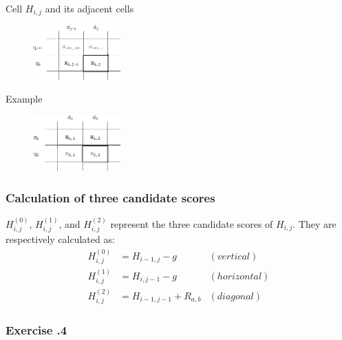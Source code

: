 \begin{multicols}{2}

Cell $H_{i, j}$ and its adjacent cells
\begin{figure}[H]
  \centering
      \includegraphics[width=0.3\textwidth]{fig02/dynamic_programmoing_cell_indices.png}
\end{figure}

Example
\begin{figure}[H]
  \centering
      \includegraphics[width=0.3\textwidth]{fig02/dynamic_programmoing_cell_indices_example.png}
\end{figure}

\end{multicols} 

%
%	
\subsubsection*{Calculation of three candidate scores}
$H_{i,j}^{(0)}$, $H_{i,j}^{(1)}$, and $H_{i,j}^{(2)}$ represent the three candidate scores of $H_{i,j}$. They are respectively calculated as:
\begin{align*}
H_{i,j}^{(0)} &= H_{i-1,j} - g &(vertical) \\
H_{i,j}^{(1)} &= H_{i,j-1} - g	&(horizontal) \\
H_{i,j}^{(2)} &= H_{i-1,j-1} + R_{a,b} &(diagonal)
\end{align*}

%
%
\subsubsection*{Exercise \thesection.4}


